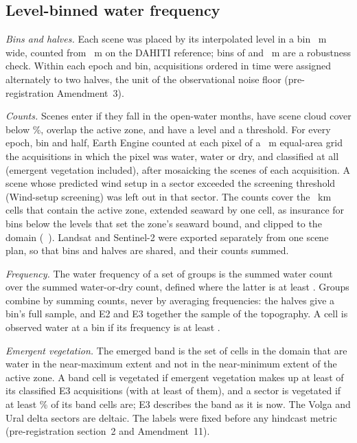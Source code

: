
\subsection*{Level-binned water frequency}
\emph{Bins and halves.} Each scene was placed by its interpolated level in a bin ~m wide, counted from ~m on the DAHITI reference; bins of  and ~m are a robustness check. Within each epoch and bin, acquisitions ordered in time were assigned alternately to two halves, the unit of the observational noise floor (pre-registration Amendment~3).

\emph{Counts.} Scenes enter if they fall in the open-water months, have scene cloud cover below \%, overlap the active zone, and have a level and a threshold. For every epoch, bin and half, Earth Engine counted at each pixel of a ~m equal-area grid the acquisitions in which the pixel was water, water or dry, and classified at all (emergent vegetation included), after mosaicking the scenes of each acquisition. A scene whose predicted wind setup in a sector exceeded the screening threshold (Wind-setup screening) was left out in that sector. The counts cover the ~km cells that contain the active zone, extended seaward by one cell, as insurance for bins below the levels that set the zone's seaward bound, and clipped to the domain (~\kmsq{}). Landsat and Sentinel-2 were exported separately from one scene plan, so that bins and halves are shared, and their counts summed.

\emph{Frequency.} The water frequency of a set of groups is the summed water count over the summed water-or-dry count, defined where the latter is at least . Groups combine by summing counts, never by averaging frequencies: the halves give a bin's full sample, and E2 and E3 together the sample of the topography. A cell is observed water at a bin if its frequency is at least .

\emph{Emergent vegetation.} The emerged band is the set of cells in the domain that are water in the  near-maximum extent and not in the  near-minimum extent of the active zone. A band cell is vegetated if emergent vegetation makes up at least  of its classified E3 acquisitions (with at least  of them), and a sector is vegetated if at least \% of its band cells are; E3 describes the band as it is now. The Volga and Ural delta sectors are deltaic. The labels were fixed before any hindcast metric (pre-registration section~2 and Amendment~11).

